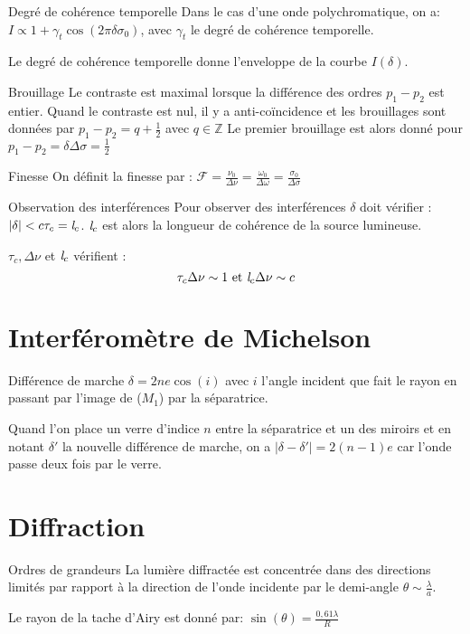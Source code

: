 \documentclass[french, a4paper, 11pt, twocolumn]{article}
\newcommand{\Z}{\mathbb{Z}}   %
\begin{document}
\begin{cadre}{Degré de cohérence temporelle}
  Dans le cas d'une onde polychromatique, on a: \(I\propto 1+\gamma_t\cos(2\pi \delta \sigma_0)\), avec \(\gamma_t\) le degré de cohérence temporelle.

  \tcblower
  Le degré de cohérence temporelle donne l'enveloppe de la courbe \(I(\delta)\).
\end{cadre}

\begin{cadre}{Brouillage}
  Le contraste est maximal lorsque la différence des ordres \(p_1-p_2\) est entier.
  Quand le contraste est nul, il y a anti-coïncidence et les brouillages sont données par \(p_1-p_2=q+\frac{1}{2}\) avec \(q\in \Z\)
  Le premier brouillage est alors donné pour \(p_1-p_2=\delta\Delta\sigma=\frac{1}{2}\)
\end{cadre}

\begin{cadre}{Finesse}
  On définit la finesse par : \(\mathcal{F}=\frac{\nu_0}{\Delta \nu}=\frac{\omega_0}{\Delta \omega}=\frac{\sigma_0}{\Delta \sigma}\)
\end{cadre}

\begin{cadre}{Observation des interférences}
  Pour observer des interférences \(\delta\) doit vérifier : \(|\delta|<c\tau_c=\emph{l}_c\).
  \(\emph{l}_c\) est alors la longueur de cohérence de la source lumineuse.

  \tcblower
  \(\tau_c, \Delta\nu\) et \(\emph{l}_c\) vérifient :
  \[\tau_c \Delta\nu \sim 1 \text{ et } \emph{l}_c \Delta\nu \sim c\]
\end{cadre}

\section{Interféromètre de Michelson}
\begin{cadre}{Différence de marche}
  \(\delta=2ne\cos(i)\) avec \(i\) l'angle incident que fait le rayon en passant par l'image de (\(M_1\)) par la séparatrice.

  \tcblower
  Quand l'on place un verre d'indice \(n\) entre la séparatrice et un des miroirs et en notant \(\delta'\) la nouvelle différence de marche,
  on a \(|\delta-\delta'|=2(n-1)e\) car l'onde passe deux fois par le verre.
\end{cadre}

\section{Diffraction}
\begin{cadre}{Ordres de grandeurs}
  La lumière diffractée est concentrée dans des directions limités par rapport à la direction de l'onde incidente par le demi-angle \(\theta\sim \frac{\lambda}{a}\).

  Le rayon de la tache d'Airy est donné par:
  \(\sin(\theta)=\frac{0,61\lambda}{R}\)
\end{cadre}
\end{document}
